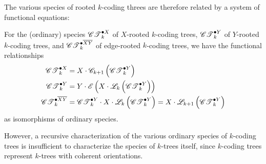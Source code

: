 \documentclass[sectionflow,singlespace,twoside,boldmathhdr,draft]{brandiss} %
\numberwithin{section}{chapter}
\numberwithin{figure}{chapter}
\begin{document}
The various species of rooted $k$-coding threes are therefore related by a system of functional equations:
\begin{theorem}
  \label{thm:funcdecompct}
  For the (ordinary) species $\pointed[X]{\specname{CT}}_{k}$ of $X$-rooted $k$-coding trees, $\pointed[Y]{\specname{CT}}_{k}$ of $Y$-rooted $k$-coding trees, and $\pointed[\overline{XY}]{\specname{CT}}_{k}$ of edge-rooted $k$-coding trees, we have the functional relationships
  \begin{subequations}
    \label{eq:ctfunc}
    \begin{align}
      \pointed[X]{\specname{CT}}_{k} &= X \cdot \specname{C}_{k+1} \pbrac{\pointed[Y]{\specname{CT}}_{k}} \label{eq:ctxfunc} \\
      \pointed[Y]{\specname{CT}}_{k} &= Y \cdot \specname{E} \pbrac{X \cdot \specname{L}_{k} \pbrac{\pointed[Y]{\specname{CT}}_{k}}} \label{eq:ctyfunc} \\
      \pointed[\overline{XY}]{\specname{CT}}_{k} &= \pointed[Y]{\specname{CT}}_{k} \cdot X \cdot \specname{L}_{k} \pbrac{\pointed[Y]{\specname{CT}}_{k}} = X \cdot \specname{L}_{k+1} \pbrac{\pointed[Y]{\specname{CT}}_{k}} \label{eq:ctxyfunc}
    \end{align}
  \end{subequations}
  as isomorphisms of ordinary species.
\end{theorem}

However, a recursive characterization of the various ordinary species of $k$-coding trees is insufficient to characterize the species of $k$-trees itself, since $k$-coding trees represent $k$-trees with coherent orientations.
\end{document}
